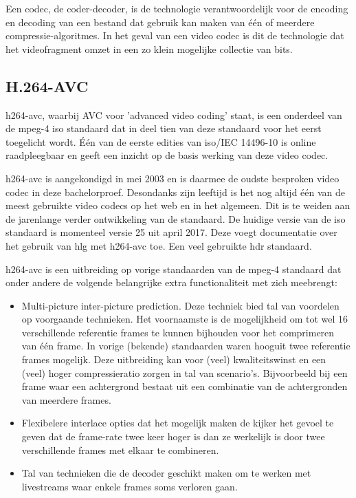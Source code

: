 Een \gls{codec}, de coder-decoder, is de technologie verantwoordelijk voor de \gls{encoding} en \gls{decoding} van een bestand dat gebruik kan maken van één of meerdere \glspl{compressie-algoritme}. In het geval van een video \gls{codec} is dit de technologie dat het videofragment omzet in een zo klein mogelijke collectie van \glspl{bit}.

\subsection{H.264-AVC}
\label{sec:videocompressie-h264-AVC}

\Gls{h264-avc}, waarbij AVC voor 'advanced video coding' staat, is een onderdeel van de \gls{mpeg-4} \gls{iso} standaard dat in deel tien van deze standaard voor het eerst toegelicht wordt. Één van de eerste edities van \gls{iso}/IEC 14496-10 is online raadpleegbaar en geeft een inzicht op de basis werking van deze video \gls{codec}.

\Gls{h264-avc} is aangekondigd in mei 2003 en is daarmee de oudste besproken video \gls{codec} in deze bachelorproef. Desondanks zijn leeftijd is het nog altijd één van de meest gebruikte video \glspl{codec} op het web en in het algemeen. Dit is te weiden aan de jarenlange verder ontwikkeling van de standaard. De huidige versie van de \gls{iso} standaard is momenteel versie 25 uit april 2017. Deze voegt documentatie over het gebruik van \gls{hlg} met \gls{h264-avc} toe. Een veel gebruikte \gls{hdr} standaard.

\Gls{h264-avc} is een uitbreiding op vorige standaarden van de \gls{mpeg-4} standaard dat onder andere de volgende belangrijke extra functionaliteit met zich meebrengt:

\begin{itemize}
	\item Multi-picture inter-picture prediction. Deze techniek bied tal van voordelen op voorgaande technieken. Het voornaamste is de mogelijkheid om tot wel 16 verschillende referentie \glspl{frame} te kunnen bijhouden voor het comprimeren van één \gls{frame}. In vorige (bekende) standaarden waren hooguit twee referentie \glspl{frame} mogelijk. Deze uitbreiding kan voor (veel) kwaliteitswinst en een (veel) hoger \gls{compressieratio} zorgen in tal van scenario's. Bijvoorbeeld bij een \gls{frame} waar een achtergrond bestaat uit een combinatie van de achtergronden van meerdere \glspl{frame}.
	
	\item Flexibelere interlace opties dat het mogelijk maken de kijker het gevoel te geven dat de \gls{frame-rate} twee keer hoger is dan ze werkelijk is door twee verschillende \glspl{frame} met elkaar te combineren.
	
	\item Tal van technieken die de \gls{decoder} geschikt maken om te werken met livestreams waar enkele \glspl{frame} soms verloren gaan.
\end{itemize}

